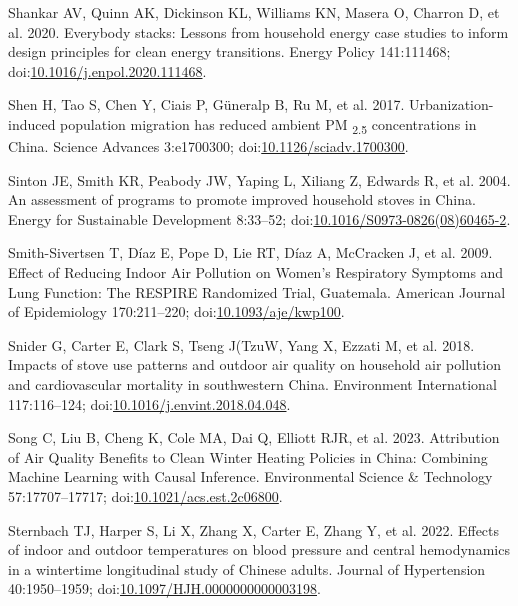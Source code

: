 \documentclass[
  letterpaper,
  DIV=11,
  numbers=noendperiod]{scrartcl}
\newlength{\cslhangindent}
\newenvironment{CSLReferences}[2] %
 {\begin{list}{}{%
  \setlength{\itemindent}{0pt}
  \setlength{\leftmargin}{0pt}
  \setlength{\parsep}{0pt}
  \ifodd #1
   \setlength{\leftmargin}{\cslhangindent}
   \setlength{\itemindent}{-1\cslhangindent}
  \fi
  \setlength{\itemsep}{#2\baselineskip}}}
 {\end{list}}
\begin{document}
\begin{CSLReferences}{1}{1}
Shankar AV, Quinn AK, Dickinson KL, Williams KN, Masera O, Charron D, et
al. 2020. Everybody stacks: {Lessons} from household energy case studies
to inform design principles for clean energy transitions. Energy Policy
141:111468;
doi:\href{https://doi.org/10.1016/j.enpol.2020.111468}{10.1016/j.enpol.2020.111468}.

Shen H, Tao S, Chen Y, Ciais P, Güneralp B, Ru M, et al. 2017.
Urbanization-induced population migration has reduced ambient {PM}
{\textsubscript{2.5}} concentrations in {China}. Science Advances
3:e1700300;
doi:\href{https://doi.org/10.1126/sciadv.1700300}{10.1126/sciadv.1700300}.

Sinton JE, Smith KR, Peabody JW, Yaping L, Xiliang Z, Edwards R, et al.
2004. An assessment of programs to promote improved household stoves in
{China}. Energy for Sustainable Development 8:33--52;
doi:\href{https://doi.org/10.1016/S0973-0826(08)60465-2}{10.1016/S0973-0826(08)60465-2}.

Smith-Sivertsen T, Díaz E, Pope D, Lie RT, Díaz A, McCracken J, et al.
2009. Effect of {Reducing Indoor Air Pollution} on {Women}'s
{Respiratory Symptoms} and {Lung Function}: {The RESPIRE Randomized
Trial}, {Guatemala}. American Journal of Epidemiology 170:211--220;
doi:\href{https://doi.org/10.1093/aje/kwp100}{10.1093/aje/kwp100}.

Snider G, Carter E, Clark S, Tseng J(TzuW, Yang X, Ezzati M, et al.
2018. Impacts of stove use patterns and outdoor air quality on household
air pollution and cardiovascular mortality in southwestern {China}.
Environment International 117:116--124;
doi:\href{https://doi.org/10.1016/j.envint.2018.04.048}{10.1016/j.envint.2018.04.048}.

Song C, Liu B, Cheng K, Cole MA, Dai Q, Elliott RJR, et al. 2023.
Attribution of {Air Quality Benefits} to {Clean Winter Heating Policies}
in {China}: {Combining Machine Learning} with {Causal Inference}.
Environmental Science \& Technology 57:17707--17717;
doi:\href{https://doi.org/10.1021/acs.est.2c06800}{10.1021/acs.est.2c06800}.

Sternbach TJ, Harper S, Li X, Zhang X, Carter E, Zhang Y, et al. 2022.
Effects of indoor and outdoor temperatures on blood pressure and central
hemodynamics in a wintertime longitudinal study of {Chinese} adults.
Journal of Hypertension 40:1950--1959;
doi:\href{https://doi.org/10.1097/HJH.0000000000003198}{10.1097/HJH.0000000000003198}.


\end{CSLReferences}
\end{document}
